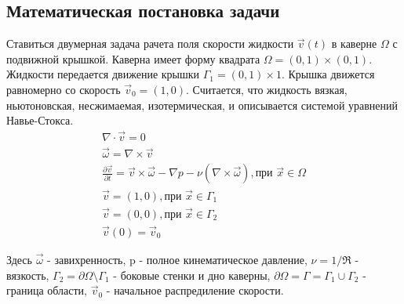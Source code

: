 \subsection{Математическая постановка задачи}

Ставиться двумерная задача рачета поля скорости жидкости $ \vec v(t) $ в каверне $ \Omega $ 
с подвижной крышкой. Каверна имеет форму квадрата $ \Omega = (0,1) \times (0,1) $. 
Жидкости передается движение крышки $ \Gamma_1 = (0,1) \times {1} $. 
Крышка движется равномерно со скорость $ \vec{v}_0 = (1,0) $. 
Считается, что жидкость вязкая, ньютоновская, несжимаемая, изотермическая, и описывается системой
уравнений Навье-Стокса.
\begin{gather}
  \nabla \cdot \vec v = 0 \\
  \vec \omega = \nabla \times \vec v \\
  \frac{\partial \vec v}{\partial t} = \vec v \times \vec \omega - \nabla p - 
  \nu ( \nabla \times \vec \omega ), \text{при } \vec x \in \Omega \\
  \vec v = (1,0), \text{при } \vec x \in \Gamma_1 \\
  \vec v = (0,0), \text{при } \vec x \in \Gamma_2 \\
  \vec v (0) = \vec v _0
\end{gather}

Здесь $ \vec \omega $ - завихренность, p - полное кинематическое давление,
$ \nu = 1 / \Re $ - вязкость, $ \Gamma_2 = \partial \Omega \setminus \Gamma_1 $ - 
боковые стенки и дно каверны, $ \partial \Omega = \Gamma = \Gamma_1 \cup \Gamma_2 $ - 
граница области, $\vec v _0$ - начальное распредиление скорости. 

